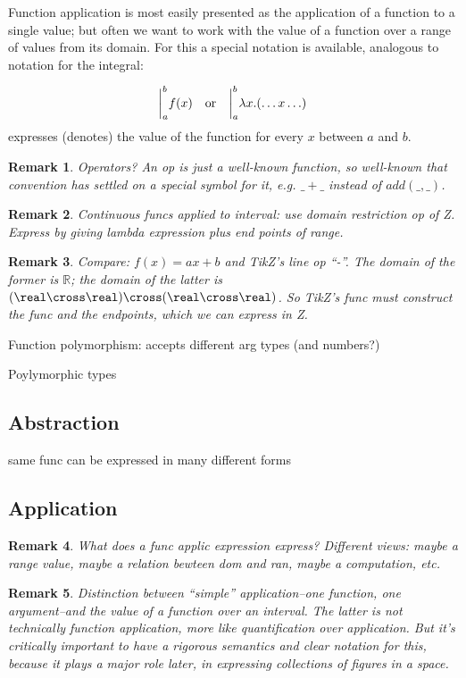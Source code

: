 \documentclass[12pt]{tufte-handout}
\numberwithin{equation}{subsection}
\numberwithin{equation}{subsection}
\newtheorem{remark}{Remark}
\newcommand\R{\(\mathds{R}\)}
\begin{document}
  Function application is most easily presented as the application of a
  function to a single value; but often we want to work with the value
  of a function over a range of values from its domain.  For this a
  special notation is available, analogous to notation for the integral:

  \[\bigg|_a^b f(x) \quad\textnormal{or}\quad\bigg|_a^b \lambda x.(\ldots x\ldots)\]
  \noindent expresses (denotes) the value of the function for every \(x\) between \(a\) and \(b\).

  \begin{remark}
    Operators?  An op is just a well-known function, so well-known that
    convention has settled on a special symbol for it, e.g. \(\_+\_\)
    instead of \(add(\_,\_)\).
  \end{remark}

  \begin{remark}
    Continuous funcs applied to interval: use domain restriction op of
    Z.  Express by giving lambda expression plus end points of range.
  \end{remark}

  \begin{remark}
    Compare: \(f(x) = ax + b\) and TikZ's line op ``-\-''.  The domain
    of the former is \R{}; the domain of the latter is
    \((\real\cross\real)\cross(\real\cross\real)\).  So TikZ's func must
    construct the func and the endpoints, which we can express in Z.
  \end{remark}

  Function polymorphism: accepts different arg types (and numbers?)

  Poylymorphic types

  \subsection{Abstraction}
  same func can be expressed in many different forms

  \subsection{Application}

  \begin{remark}
    What does a func applic expression express?  Different views:
    maybe a range value, maybe a relation bewteen dom and ran, maybe a
    computation, etc.
  \end{remark}

  \begin{remark}
    Distinction between ``simple'' application--one function, one
    argument--and the value of a function over an interval.  The
    latter is not technically function application, more like
    quantification over application.  But it's critically important to
    have a rigorous semantics and clear notation for this, because it
    plays a major role later, in expressing collections of figures in
    a space.
  \end{remark}
\end{document}
